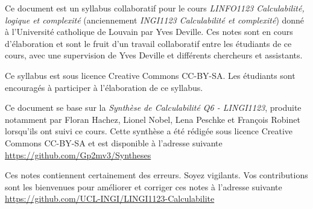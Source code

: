 
Ce document est un syllabus collaboratif pour le cours  \emph{LINFO1123 Calculabilité, logique et complexité} (anciennement \emph{INGI1123 Calculabilité et complexité})  donné à l'Université catholique de Louvain par Yves Deville.  Ces notes sont en cours d'élaboration et sont le fruit d'un travail collaboratif entre les étudiants de ce cours, avec une supervision de Yves Deville et différents chercheurs et assistants.

Ce syllabus est sous licence Creative Commons CC-BY-SA.  Les étudiants sont encouragés à participer à l'élaboration de ce syllabus.

Ce document se base sur la \emph{Synthèse de Calculabilité Q6 - LINGI1123}, produite notamment par Floran Hachez, Lionel Nobel, Lena Peschke et François Robinet lorsqu'ils ont suivi ce cours.  Cette synthèse a été rédigée sous licence Creative Commons CC-BY-SA et est disponible à l’adresse suivante
\url{https://github.com/Gp2mv3/Syntheses}

Ces notes contiennent certainement des erreurs.  Soyez vigilants.  Vos contributions sont les bienvenues pour améliorer et corriger ces notes à l'adresse suivante
\url{https://github.com/UCL-INGI/LINGI1123-Calculabilite}
